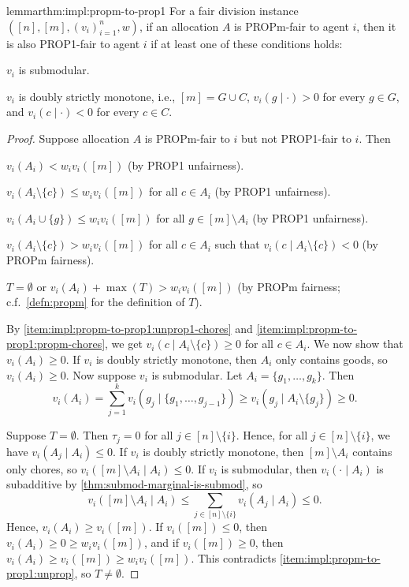 \begin{restatable}{lemma}{rthm:impl:propm-to-prop1}
\label{thm:impl:propm-to-prop1}
For a fair division instance $([n], [m], (v_i)_{i=1}^n, w)$,
if an allocation $A$ is PROPm-fair to agent $i$, then it is also PROP1-fair to agent $i$
if at least one of these conditions holds:
\begin{tightenum}
\item $v_i$ is submodular.
\item $v_i$ is doubly strictly monotone, i.e., $[m] = G \cup C$, $v_i(g \mid \cdot) > 0$
    for every $g \in G$, and $v_i(c \mid \cdot) < 0$ for every $c \in C$.
\end{tightenum}
\end{restatable}
\begin{proof}
Suppose allocation $A$ is PROPm-fair to $i$ but not PROP1-fair to $i$. Then
\begin{tightenum}
\item\label{item:impl:propm-to-prop1:unprop}$v_i(A_i) < w_iv_i([m])$ (by PROP1 unfairness).
\item\label{item:impl:propm-to-prop1:unprop1-chores}$v_i(A_i \setminus \{c\}) \le w_iv_i([m])$
    for all $c \in A_i$ (by PROP1 unfairness).
\item\label{item:impl:propm-to-prop1:unprop1-goods}$v_i(A_i \cup \{g\}) \le w_iv_i([m])$
    for all $g \in [m] \setminus A_i$ (by PROP1 unfairness).
\item\label{item:impl:propm-to-prop1:propm-chores}$v_i(A_i \setminus \{c\}) > w_iv_i([m])$
    for all $c \in A_i$ such that $v_i(c \mid A_i \setminus \{c\}) < 0$ (by PROPm fairness).
\item\label{item:impl:propm-to-prop1:propm-goods}$T = \emptyset$ or $v_i(A_i) + \max(T) > w_iv_i([m])$
    (by PROPm fairness; c.f.~\cref{defn:propm} for the definition of $T$).
\end{tightenum}

By \ref{item:impl:propm-to-prop1:unprop1-chores} and \ref{item:impl:propm-to-prop1:propm-chores},
we get $v_i(c \mid A_i \setminus \{c\}) \ge 0$ for all $c \in A_i$.
We now show that $v_i(A_i) \ge 0$.
If $v_i$ is doubly strictly monotone, then $A_i$ only contains goods, so $v_i(A_i) \ge 0$.
Now suppose $v_i$ is submodular. Let $A_i = \{g_1, \ldots, g_k\}$. Then
\[ v_i(A_i) = \sum_{j=1}^k v_i(g_j \mid \{g_1, \ldots, g_{j-1}\})
    \ge v_i(g_j \mid A_i \setminus \{g_j\}) \ge 0. \]

Suppose $T = \emptyset$. Then $\tau_j = 0$ for all $j \in [n] \setminus \{i\}$.
Hence, for all $j \in [n] \setminus \{i\}$, we have $v_i(A_j \mid A_i) \le 0$.
If $v_i$ is doubly strictly monotone, then $[m] \setminus A_i$ contains only chores,
so $v_i([m] \setminus A_i \mid A_i) \le 0$. If $v_i$ is submodular, then
$v_i(\cdot \mid A_i)$ is subadditive by \cref{thm:submod-marginal-is-submod}, so
\[ v_i([m] \setminus A_i \mid A_i)
    \le \sum_{j \in [n] \setminus \{i\}} v_i(A_j \mid A_i) \le 0. \]
Hence, $v_i(A_i) \ge v_i([m])$.
If $v_i([m]) \le 0$, then $v_i(A_i) \ge 0 \ge w_iv_i([m])$,
and if $v_i([m]) \ge 0$, then $v_i(A_i) \ge v_i([m]) \ge w_iv_i([m])$.
This contradicts \ref{item:impl:propm-to-prop1:unprop}, so $T \neq \emptyset$.


\end{proof}
